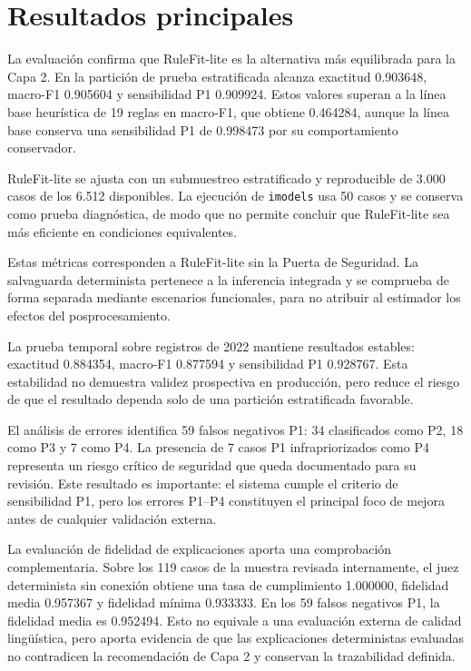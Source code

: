 \section{Resultados principales}

La evaluación confirma que RuleFit-lite es la alternativa más equilibrada para la Capa
2. En la partición de prueba estratificada alcanza exactitud 0.903648, macro-F1
0.905604 y sensibilidad P1 0.909924. Estos valores superan a la línea base heurística de
19 reglas en macro-F1, que obtiene 0.464284, aunque la línea base conserva una sensibilidad P1
de 0.998473 por su
comportamiento conservador.

RuleFit-lite se ajusta con un submuestreo estratificado y reproducible de 3.000 casos de
los 6.512 disponibles. La ejecución de \texttt{imodels} usa 50 casos y se conserva como
prueba diagnóstica, de modo que no permite concluir que RuleFit-lite sea más eficiente
en condiciones equivalentes.

Estas métricas corresponden a RuleFit-lite sin la Puerta de Seguridad. La salvaguarda
determinista pertenece a la inferencia integrada y se comprueba de forma separada
mediante escenarios funcionales, para no atribuir al estimador los efectos del
posprocesamiento.

La prueba temporal sobre registros de 2022 mantiene resultados estables: exactitud
0.884354, macro-F1 0.877594 y sensibilidad P1 0.928767. Esta estabilidad no demuestra validez
prospectiva en producción, pero reduce el riesgo de que el resultado dependa solo de una
partición estratificada favorable.

El análisis de errores identifica 59 falsos negativos P1: 34 clasificados como P2, 18
como P3 y 7 como P4. La presencia de 7 casos P1 infrapriorizados como P4 representa un riesgo crítico de seguridad que queda documentado para su revisión. Este resultado es importante:
el sistema cumple el criterio de sensibilidad P1, pero los errores P1--P4 constituyen
el principal foco de mejora antes de cualquier validación externa.

La evaluación de fidelidad de explicaciones aporta una comprobación complementaria. Sobre
los 119 casos de la muestra revisada internamente, el juez determinista sin conexión obtiene una tasa de cumplimiento
1.000000, fidelidad media 0.957367 y fidelidad mínima 0.933333. En los 59 falsos
negativos P1, la fidelidad media es 0.952494. Esto no equivale a una evaluación externa
de calidad lingüística, pero aporta evidencia de que las explicaciones deterministas
evaluadas no contradicen la recomendación de Capa 2 y conservan la trazabilidad definida.

